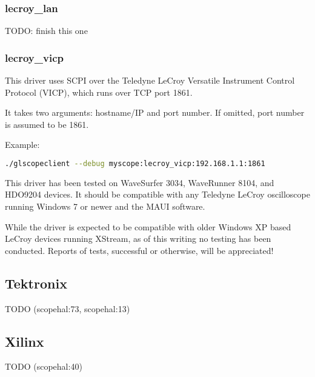 \subsubsection{lecroy\_lan}

TODO: finish this one

\subsubsection{lecroy\_vicp}

This driver uses SCPI over the Teledyne LeCroy Versatile Instrument Control Protocol (VICP), which runs over TCP port
1861.

It takes two arguments: hostname/IP and port number. If omitted, port number is assumed to be 1861.

Example:
\begin{lstlisting}[language=sh]
./glscopeclient --debug myscope:lecroy_vicp:192.168.1.1:1861
\end{lstlisting}

This driver has been tested on WaveSurfer 3034, WaveRunner 8104, and HDO9204 devices. It should be compatible with any
Teledyne LeCroy oscilloscope running Windows 7 or newer and the MAUI software.

While the driver is expected to be compatible with older Windows XP based LeCroy devices running XStream, as of this
writing no testing has been conducted. Reports of tests, successful or otherwise, will be appreciated!

\subsection{Tektronix}
TODO (scopehal:73, scopehal:13)

\subsection{Xilinx}
TODO (scopehal:40)
